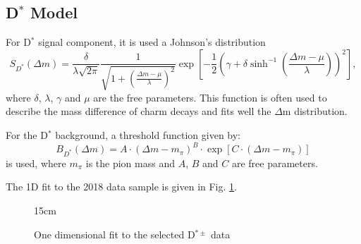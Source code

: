 \subsection{\texorpdfstring{D$^{*}$}{D*} Model}

For D$^*$ signal component, it is used a Johnson's distribution
\begin{equation}\label{eq:dstar_sig}
  S_{D^*}(\Delta m) = \frac{\delta}{\lambda\sqrt{2\pi}} \frac{1}{\sqrt{1 + \left(\frac{\Delta m-\mu}{\lambda}\right)^2}}\exp{\left[-\frac{1}{2}\left(\gamma+\delta\sinh^{-1}\left(\frac{\Delta m-\mu}{\lambda}\right)\right)^2\right]},
\end{equation}
where $\delta$, $\lambda$, $\gamma$ and $\mu$ are the free parameters. This function is often used to describe the mass difference of charm decays and fits well the $\Delta$m distribution.

For the D$^*$ background, a threshold function \cite{ZEUS:2013fws} given by:
\begin{equation} \label{eq:dstar_bkg}
  B_{D^*}(\Delta m) = A \cdot (\Delta m - m_\pi)^B \cdot \exp[C\cdot (\Delta m-m_\pi)]
\end{equation}
is used, where $m_\pi$ is the pion mass and $A$, $B$ and $C$ are free parameters.

The 1D fit to the 2018 data sample is given in Fig. \ref{fig:fit1D_dstar}.

\begin{figure}[!htm]{15cm}
  \caption{One dimensional fit to the selected D$^{*\pm}$ data}%
  \label{fig:fit1D_dstar}
\end{figure}

